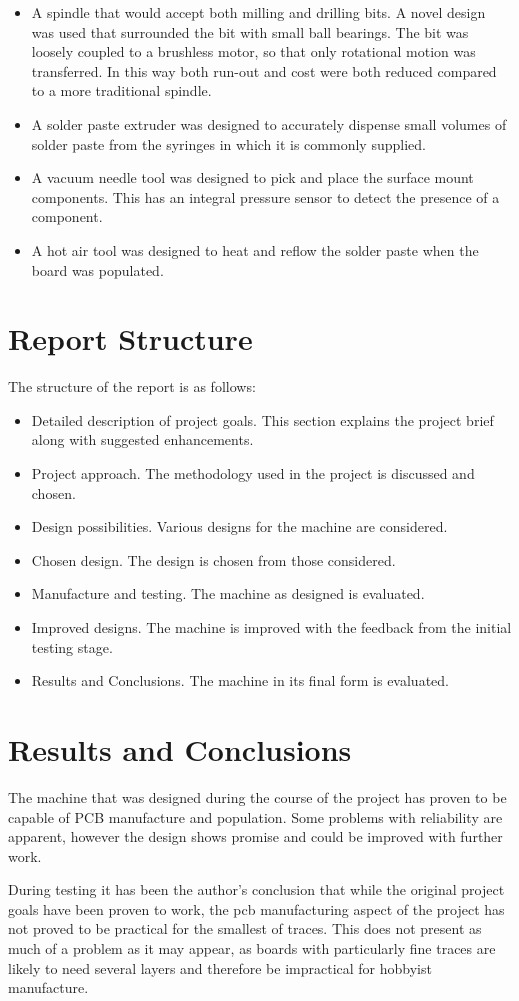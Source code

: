 \documentclass[a4paper,11pt]{article}  %
\begin{document}
\begin{itemize}\itemsep0em
\item
A spindle that would accept both milling and drilling bits. A novel design
was used that surrounded the bit with small ball bearings. The bit was loosely
coupled to a brushless motor, so that only rotational motion was transferred.
In this way both run-out and cost were both reduced compared to a more
traditional spindle.
\item
A solder paste extruder was designed to accurately dispense small volumes
of solder paste from the syringes in which it is commonly supplied.
\item
A vacuum needle tool was designed to pick and place the surface mount
components. This has an integral pressure sensor to detect the presence of
a component.
\item
A hot air tool was designed to heat and reflow the solder paste when the board
was populated.
\end{itemize}

\section*{Report Structure}
The structure of the report is as follows:

\begin{itemize}\itemsep0em
\item
Detailed description of project goals. This section explains the project
brief along with suggested enhancements.
\item
Project approach. The methodology used in the project is discussed and 
chosen.
\item
Design possibilities. Various designs for the machine are considered.
\item
Chosen design. The design is chosen from those considered.
\item
Manufacture and testing. The machine as designed is evaluated.
\item
Improved designs. The machine is improved with the feedback from the initial testing stage.
\item
Results and Conclusions. The machine in its final form is evaluated.
\end{itemize}

\section*{Results and Conclusions}
The machine that was designed during the course of the project has proven
to be capable of PCB manufacture and population. Some problems with
reliability are apparent, however the design shows promise and could be
improved with further work.

During testing it has been the author's conclusion that while the original
project goals have been proven to work, the pcb manufacturing aspect of the
project has not proved to be practical for the smallest of traces. This
does not present as much of a problem as it may appear, as boards with particularly fine
traces are likely to need several layers and therefore be impractical for
hobbyist manufacture.
\end{document}
